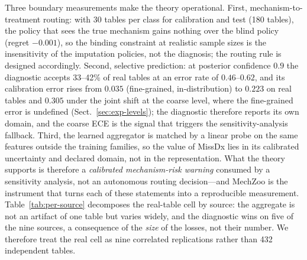 \documentclass[conference]{IEEEtran}
\begin{document}
Three boundary measurements make the theory operational. First,
mechanism-to-treatment routing: with 30 tables per class for
calibration and test (180 tables), the policy that sees the true mechanism gains nothing over
the blind policy (regret $-0.001$), so the binding constraint at realistic sample sizes is the
insensitivity of the imputation policies, not the diagnosis; the routing rule is designed
accordingly. Second, selective prediction: at posterior confidence $0.9$ the diagnostic
accepts 33--42\% of real tables at an error rate of $0.46$--$0.62$, and its calibration
error rises from $0.035$ (fine-grained, in-distribution) to $0.223$ on real tables and
$0.305$ under the joint shift at the coarse level, where the fine-grained error is undefined
(Sect.~\ref{sec:exp-levels}); the diagnostic therefore reports its own domain, and the
coarse ECE is the signal that triggers the sensitivity-analysis fallback. Third, the learned
aggregator is matched by a linear probe on the same features outside the training families,
so the value of MissDx lies in its calibrated uncertainty and declared domain, not in the
representation. What the theory supports
is therefore a \emph{calibrated mechanism-risk warning} consumed by a sensitivity analysis,
not an autonomous routing decision---and MechZoo is the instrument that turns each of these
statements into a reproducible measurement. Table~\ref{tab:per-source} decomposes the
real-table cell by source: the aggregate is not an artifact of one table but varies widely,
and the diagnostic wins on five of the nine sources, a consequence of the
\emph{size} of the losses, not their number. We therefore treat the real cell as nine
correlated replications rather than 432 independent tables.
\end{document}
